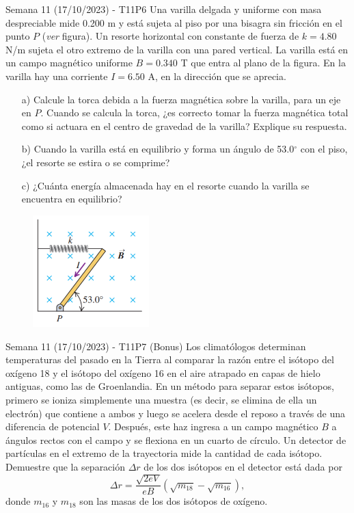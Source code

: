 \begin{frame}{Semana 11 (17/10/2023) - T11P6}
\footnotesize
    Una varilla delgada
y uniforme con masa despreciable mide
0.200 m y está sujeta al piso por una 
bisagra sin fricción en el punto $P$ (\textit{ver} figura). Un resorte horizontal con constante de fuerza de $k = 4.80$ N/m sujeta 
el otro extremo de la varilla con una
pared vertical. La varilla está en un
campo magnético uniforme $B = 0.340$ T
que entra al plano de la figura. En la 
varilla hay una corriente $I = 6.50$ A, en
la dirección que se aprecia.

\begin{itemize}
    \item[a)] Calcule la torca debida a la fuerza 
magnética sobre la varilla, para un eje en $P$. Cuando se calcula la 
torca, ¿es correcto tomar la fuerza magnética total como si actuara en
el centro de gravedad de la varilla? Explique su respuesta.
    \item[b)] Cuando
la varilla está en equilibrio y forma un ángulo de 53.0$^\circ$ con el piso, ¿el
resorte se estira o se comprime?
    \item[c)] ¿Cuánta energía almacenada hay 
en el resorte cuando la varilla se encuentra en equilibrio?
\end{itemize}

\vspace{-1em}

\begin{figure}
    \centering
    \includegraphics[width=0.4\textwidth, height=0.3\textwidth]{figures/t10p3.png}
\end{figure}
    
\end{frame}

\begin{frame}{Semana 11 (17/10/2023) - T11P7 (Bonus)}
\small
    Los climatólogos determinan temperaturas del
pasado en la Tierra al comparar la razón entre el isótopo del oxígeno
18 y el isótopo del oxígeno 16 en el aire atrapado en capas de hielo
antiguas, como las de Groenlandia. En un método para separar estos
isótopos, primero se ioniza simplemente una muestra (es decir, se elimina de ella un electrón) que contiene a ambos y luego se acelera
desde el reposo a través de una diferencia de potencial $V$. Después,
este haz ingresa a un campo magnético $B$ a ángulos rectos con el
campo y se flexiona en un cuarto de círculo. Un detector de partículas
en el extremo de la trayectoria mide la cantidad de cada isótopo. Demuestre que la separación $\Delta r$ de los dos isótopos en el detector
está dada por $$\Delta r = \frac{\sqrt{2eV}}{eB}  \left(\sqrt{m_{18}}-\sqrt{m_{16}}\right),$$ donde $m_{16}$ y $m_{18}$ son las masas de los dos isótopos de oxígeno.
    
\end{frame}

